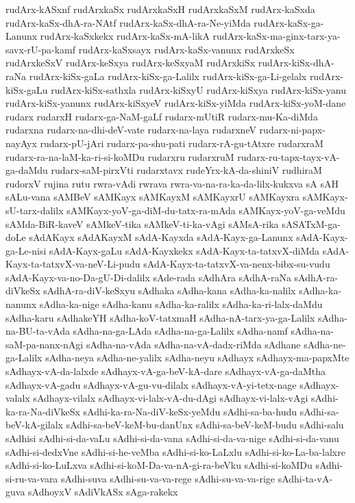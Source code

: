{rudArx-kASxnf
rudArxkaSx
rudArxkaSxH
rudArxkaSxM
rudArx-kaSxda
rudArx-kaSx-dhA-ra-NAtf
rudArx-kaSx-dhA-ra-Ne-yiMda
rudArx-kaSx-ga-Lanunx
rudArx-kaSxkekx
rudArx-kaSx-mA-likA
rudArx-kaSx-ma-ginx-tarx-ya-savx-rU-pa-kamf
rudArx-kaSxsayx
rudArx-kaSx-vanunx
rudArxkeSx
rudArxkeSxV
rudArx-keSxya
rudArx-keSxyaM
rudArxkiSx
rudArx-kiSx-dhA-raNa
rudArx-kiSx-gaLa
rudArx-kiSx-ga-Lalilx
rudArx-kiSx-ga-Li-gelalx
rudArx-kiSx-gaLu
rudArx-kiSx-sathxla
rudArx-kiSxyU
rudArx-kiSxya
rudArx-kiSx-yanu
rudArx-kiSx-yanunx
rudArx-kiSxyeV
rudArx-kiSx-yiMda
rudArx-kiSx-yoM-dane
rudarx
rudarxH
rudarx-ga-NaM-gaLf
rudarx-mUtiR
rudarx-mu-Ka-diMda
rudarxna
rudarx-na-dhi-deV-vate
rudarx-na-laya
rudarxneV
rudarx-ni-papx-nayAyx
rudarx-pU-jAri
rudarx-pa-shu-pati
rudarx-rA-gu-tAtxre
rudarxraM
rudarx-ra-na-laM-ka-ri-si-koMDu
rudarxru
rudarxruM
rudarx-ru-tapx-tayx-vA-ga-daMdu
rudarx-saM-pirxVti
rudarxtavx
rudeYrx-kA-da-shiniV
rudhiraM
rudorxV
rujina
rutu
rwra-vAdi
rwrava
rwra-va-na-ra-ka-da-lilx-kukxva
sA
sAH
sALu-vana
sAMBeV
sAMKayx
sAMKayxM
sAMKayxrU
sAMKayxra
sAMKayx-sU-tarx-dalilx
sAMKayx-yoV-ga-diM-du-tatx-ra-mAda
sAMKayx-yoV-ga-veMdu
sAMda-BiR-kaveV
sAMkeV-tika
sAMkeV-ti-ka-vAgi
sAMsA-rika
sASATxM-ga-doLe
sAdAKayx
sAdAKayxM
sAdA-Kayxda
sAdA-Kayx-ga-Lanunx
sAdA-Kayx-ga-Le-nisi
sAdA-Kayx-gaLu
sAdA-Kayxkekx
sAdA-Kayx-ta-tatxvX-diMda
sAdA-Kayx-ta-tatxvX-va-neV-Li-pudu
sAdA-Kayx-ta-tatxvX-va-nenx-bibx-su-vudu
sAdA-Kayx-va-no-Da-gU-Di-dalilx
sAde-rada
sAdhAra
sAdhA-raNa
sAdhA-ra-diVkeSx
sAdhA-ra-diV-keSxyu
sAdhaka
sAdha-kana
sAdha-ka-nalilx
sAdha-ka-nanunx
sAdha-ka-nige
sAdha-kanu
sAdha-ka-ralilx
sAdha-ka-ri-lalx-daMdu
sAdha-karu
sAdhakeYH
sAdha-koV-tatxmaH
sAdha-nA-tarx-ya-ga-Lalilx
sAdha-na-BU-ta-vAda
sAdha-na-ga-LAda
sAdha-na-ga-Lalilx
sAdha-namf
sAdha-na-saM-pa-nanx-nAgi
sAdha-na-vAda
sAdha-na-vA-dadx-riMda
sAdhane
sAdha-ne-ga-Lalilx
sAdha-neya
sAdha-ne-yalilx
sAdha-neyu
sAdhayx
sAdhayx-ma-papxMte
sAdhayx-vA-da-lalxde
sAdhayx-vA-ga-beV-kA-dare
sAdhayx-vA-ga-daMtha
sAdhayx-vA-gadu
sAdhayx-vA-gu-vu-dilalx
sAdhayx-vA-yi-tetx-nage
sAdhayx-valalx
sAdhayx-vilalx
sAdhayx-vi-lalx-vA-du-dAgi
sAdhayx-vi-lalx-vAgi
sAdhi-ka-ra-Na-diVkeSx
sAdhi-ka-ra-Na-diV-keSx-yeMdu
sAdhi-sa-ba-hudu
sAdhi-sa-beV-kA-gilalx
sAdhi-sa-beV-keM-bu-danUnx
sAdhi-sa-beV-keM-budu
sAdhi-salu
sAdhisi
sAdhi-si-da-vaLu
sAdhi-si-da-vana
sAdhi-si-da-va-nige
sAdhi-si-da-vanu
sAdhi-si-dedxVne
sAdhi-si-he-veMba
sAdhi-si-ko-LaLxlu
sAdhi-si-ko-La-ba-lalxre
sAdhi-si-ko-LuLxva
sAdhi-si-koM-Da-va-nA-gi-ra-beVku
sAdhi-si-koMDu
sAdhi-si-ru-va-vara
sAdhi-suva
sAdhi-su-va-va-rege
sAdhi-su-va-va-rige
sAdhi-ta-vA-guva
sAdhoyxV
sAdiVkASx
sAga-rakekx
}

